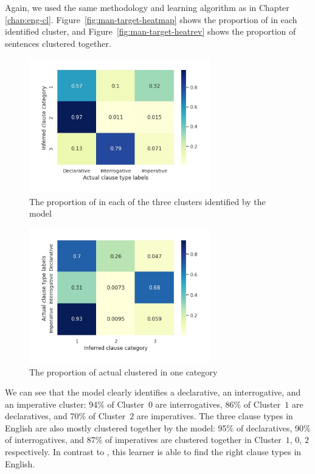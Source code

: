 Again, we used the same methodology and learning algorithm as in Chapter \ref{chap:eng-cl}.
Figure~\ref{fig:man-target-heatmap} shows the proportion of \diis{} in each identified cluster, and Figure~\ref{fig:man-target-heatrev} shows the proportion of sentences clustered together. 
\begin{figure}[H]
    \centering
    \includegraphics[width=0.7\textwidth]{figures/man-target-conservative-heatmap.jpg}
    \caption{The proportion of \diis{} in each of the three clusters identified by the \plearnerabbr{} model}
    \label{fig:man-target-conservative-heatmap}
\end{figure}




\begin{figure}[H]
    \centering
    \includegraphics[width=0.7\textwidth]{figures/man-target-conservative-heatrev.jpg}
    \caption{The proportion of actual \diis{} clustered in one category}
    \label{fig:man-target-conservative-heatrev}
\end{figure}


We can see that the \plearnerabbr{} model clearly identifies a declarative, an interrogative, and an imperative cluster: 94\% of Cluster~$0$ are interrogatives, 86\% of Cluster~$1$ are declaratives, and 70\% of Cluster~$2$ are imperatives. The three clause types in English are also mostly clustered together by the model: 95\% of declaratives, 90\% of interrogatives, and 87\% of imperatives are clustered together in Cluster~$1$, $0$, $2$ respectively. In contrast to \dlearnerabbr{}, this learner is able to find the right clause types in English.



